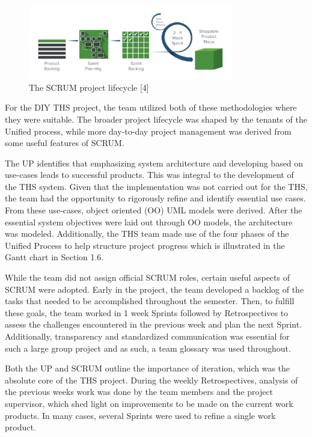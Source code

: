 \documentclass[fontsize=11pt]{extarticle}
\numberwithin{figure}{section} %
\numberwithin{table}{section}%
\begin{document}
\begin{figure}[H]
      \centering
      \includegraphics[trim = 0 0 0 0, clip, width=0.8\textwidth]{TempImg/SCRUM.png}
      \caption{The SCRUM project lifecycle [4]}
 \end{figure}

For the DIY THS project, the team utilized both of these methodologies
where they were suitable. The broader project lifecycle was shaped by
the tenants of the Unified process, while more day-to-day project
management was derived from some useful features of SCRUM.

The UP identifies that emphasizing system architecture and developing
based on use-cases leads to successful products. This was integral to
the development of the THS system. Given that the implementation was not
carried out for the THS, the team had the opportunity to rigorously
refine and identify essential use cases. From these use-cases, object
oriented (OO) UML models were derived. After the essential system
objectives were laid out through OO models, the architecture was
modeled. Additionally, the THS team made use of the four phases of the
Unified Process to help structure project progress which is illustrated
in the Gantt chart in Section 1.6.

While the team did not assign official SCRUM roles, certain useful
aspects of SCRUM were adopted. Early in the project, the team developed
a backlog of the tasks that needed to be accomplished throughout the
semester. Then, to fulfill these goals, the team worked in 1 week
Sprints followed by Retrospectives to assess the challenges encountered
in the previous week and plan the next Sprint. Additionally,
transparency and standardized communication was essential for such a
large group project and as such, a team glossary was used throughout.

Both the UP and SCRUM outline the importance of iteration, which was the
absolute core of the THS project. During the weekly Retrospectives,
analysis of the previous weeks work was done by the team members and the
project supervisor, which shed light on improvements to be made on the
current work products. In many cases, several Sprints were used to
refine a single work product.
\end{document}
